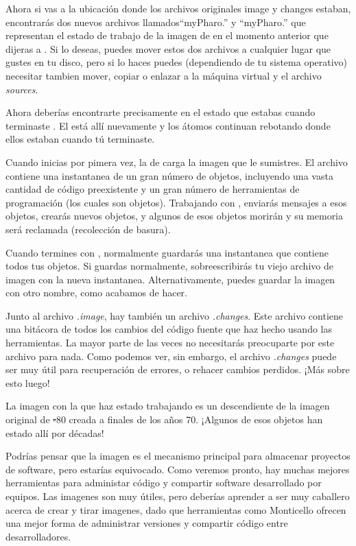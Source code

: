 \documentclass[a4paper,10pt,twoside]{book}
\begin{document}
Ahora si vas a la ubicaci\'on donde los archivos originales image y changes estaban, encontrar\'as dos nuevos archivos llamados``myPharo.'' y ``myPharo.'' que representan el estado de trabajo de la imagen de \pharo en el momento anterior que dijeras a \pharo {}.
Si lo deseas, puedes mover estos dos archivos a cualquier lugar que gustes en tu disco, pero si lo haces puedes (dependiendo de tu sistema operativo) necesitar tambien mover, copiar o enlazar a la m\'aquina virtual y el archivo \emph{sources}.


Ahora deber\'ias encontrarte precisamente en el estado que estabas cuando terminaste \pharo. El \bam est\'a all\'i nuevamente y los \'atomos continuan rebotando donde ellos estaban cuando t\'u terminaste.

Cuando inicias \pharo por pimera vez, la  de \pharo carga la imagen que le sumistres. El archivo contiene una instantanea de un gran n\'umero de objetos, incluyendo una vasta cantidad de c\'odigo preexistente y un gran n\'umero de herramientas de programaci\'on (los cuales son objetos). Trabajando con \pharo, enviar\'as mensajes a esos objetos, crear\'as nuevos objetos, y algunos de esos objetos morir\'an y su memoria ser\'a reclamada (\ie recolecci\'on de basura).

Cuando termines con \pharo, normalmente guardar\'as una instantanea que contiene todos tus objetos. Si guardas normalmente, sobreescribir\'as tu viejo archivo de imagen con la nueva instantanea. Alternativamente, puedes guardar la imagen con otro nombre, como acabamos de hacer.

Junto al archivo \emph{.image}, hay tambi\'en un archivo \emph{.changes}.
Este archivo contiene una bit\'acora de todos los cambios del c\'odigo fuente que haz hecho usando las herramientas.
La mayor parte de las veces no necesitar\'as preocuparte por este archivo para nada.
Como podemos ver, sin embargo, el archivo \emph{.changes} puede ser muy \'util para recuperaci\'on de errores, o rehacer cambios perdidos.
¡M\'as sobre esto luego!

La imagen con la que haz estado trabajando es un descendiente de la imagen original de \st-80 creada a finales de los a\~nos 70.
¡Algunos de esos objetos han estado all\'i por d\'ecadas!

Podr\'ias pensar que la imagen es el mecanismo principal para almacenar proyectos de software, pero estar\'ias equivocado.
Como veremos pronto, hay muchas mejores herramientas para administar c\'odigo y compartir software desarrollado por equipos.
Las imagenes son muy \'utiles, pero deber\'ias aprender a ser muy caballero acerca de crear y tirar imagenes, dado que herramientas como Monticello ofrecen una mejor forma de administrar versiones y compartir c\'odigo entre desarrolladores.
\end{document}
